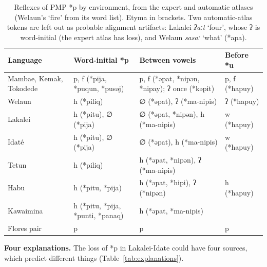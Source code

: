 \documentclass[11pt]{article}
\newcommand{\hd}[1]{\begin{minipage}[b]{\linewidth}\raggedright #1\end{minipage}}
\begin{document}
\begin{table}[tbp]
\caption{Reflexes of PMP *p by environment, from the expert and
automatic atlases (Welaun's `fire' from its word list). Etyma in
brackets. Two automatic-atlas tokens are left out as probable alignment
artifacts: Lakalei \emph{ʔaːt} `four', whose ʔ is word-initial (the
expert atlas has loss), and Welaun \emph{sasaː} `what'
(*apa).}
\label{tab:preflexes}
\begin{tabularx}{\linewidth}{@{}L{1}L{1}L{1}L{1}@{}}
\toprule
\hd{Language} & \hd{Word-initial *p} & \hd{Between vowels} & \hd{Before *u} \\
\midrule
Mambae, Kemak, Tokodede & p, f (*pija, *puqun, *pusəj) & p, f (*əpat, *nipən, *nipay); ʔ once (*kəpit) & p, f (*hapuy) \\
Welaun & h (*piliq) & ∅ (*əpat), ʔ (*ma-nipis) & ʔ (*hapuy) \\
Lakalei & h (*pitu), ∅ (*pija) & ∅ (*əpat, *nipən), h (*ma-nipis) & w (*hapuy) \\
Idaté & h (*pitu), ∅ (*pija) & ∅ (*əpat), h (*ma-nipis) & w (*hapuy) \\
Tetun & h (*piliq) & h (*əpat, *nipən), ʔ (*ma-nipis) & \\
Habu & h (*pitu, *pija) & h (*əpat, *hipi), ʔ (*nipən) & h (*hapuy) \\
Kawaimina & h (*pitu, *pija, *punti, *panaq) & h (*əpat, *ma-nipis) & \\
Flores pair & p & p & p \\
\bottomrule
\end{tabularx}
\end{table}

\textbf{Four explanations.} The loss of *p in Lakalei-Idate could have four sources, which predict different things (Table~\ref{tab:explanations}).
\end{document}
